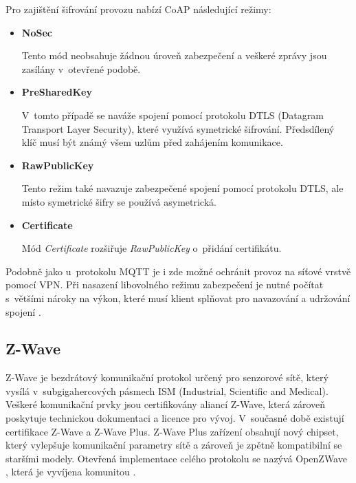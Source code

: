    Pro zajištění šifrování provozu nabízí CoAP následující režimy:
   \begin{itemize}
    \item \textbf{NoSec}
    
    Tento mód neobsahuje žádnou úroveň zabezpečení a veškeré zprávy jsou zasílány
    v~otevřené podobě. 
    
    \item \textbf{PreSharedKey}
    
    V~tomto případě se naváže spojení pomocí protokolu DTLS (Datagram Transport
    Layer Security), které využívá symetrické šifrování. Předsdílený klíč musí
    být známý všem uzlům před zahájením komunikace. 
    
    \item \textbf{RawPublicKey}
    
    Tento režim také navazuje zabezpečené spojení pomocí protokolu DTLS, ale místo
    symetrické šifry se používá asymetrická.
    
    \item \textbf{Certificate}
    
    Mód \textit{Certificate} rozšiřuje \textit{RawPublicKey} o~přidání certifikátu.
   \end{itemize}

   Podobně jako u~protokolu MQTT je i zde možné ochránit provoz na síťové
   vrstvě pomocí VPN. Při nasazení libovolného režimu zabezpečení je nutné počítat 
   s~většími nároky na výkon, které musí klient splňovat pro navazování a udržování 
   spojení \cite{coap}.
   
  \subsection{Z-Wave}
  
  Z-Wave je bezdrátový komunikační protokol určený pro senzorové sítě, který vysílá 
  v~subgigahercových pásmech ISM (Industrial, Scientific and Medical). Veškeré komunikační
  prvky jsou certifikovány aliancí Z-Wave, která zároveň poskytuje technickou dokumentaci a
  licence pro vývoj. V~současné době existují certifikace Z-Wave a Z-Wave Plus. 
  Z-Wave Plus zařízení obsahují nový chipset, který vylepšuje komunikační parametry
  sítě a zároveň je zpětně kompatibilní se staršími modely. \cite{z-plus}
  Otevřená implementace celého protokolu se nazývá OpenZWave \cite{openzwave}, která
  je vyvíjena komunitou \cite{cesnet-survey}.
 
